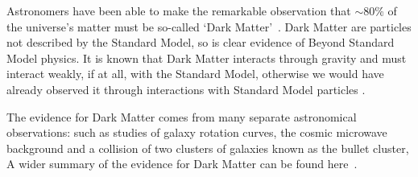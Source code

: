 Astronomers have been able to make the remarkable observation that
$\sim$80\% of the universe's matter must be so-called `Dark Matter'~\cite{theo-bsm_dm_peskin}.
Dark Matter are particles not described by the Standard Model,
so is clear evidence of Beyond Standard Model physics.
It is known that Dark Matter interacts through gravity
and must interact weakly, if at all, with the Standard Model,
otherwise we would have already observed it through interactions with Standard Model particles .

The evidence for Dark Matter comes from many separate astronomical observations:
such as studies of
galaxy rotation curves,
the cosmic microwave background
and a collision of two clusters of galaxies known as the bullet cluster,
A wider summary of the evidence for Dark Matter can be found here~\cite{theo-bsm_dm_evidence}.

%

